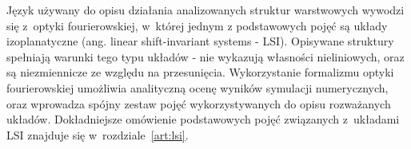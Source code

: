 Język używany do opisu działania analizowanych struktur warstwowych wywodzi się z~optyki fourierowskiej, w~której jednym z podstawowych pojęć są układy izoplanatyczne (ang. linear shift-invariant systems - LSI). Opisywane struktury spełniają warunki tego typu układów - nie wykazują własności nieliniowych, oraz są niezmiennicze ze względu na przesunięcia. Wykorzystanie formalizmu optyki fourierowskiej umożliwia analityczną ocenę wyników symulacji numerycznych, oraz wprowadza spójny zestaw pojęć wykorzystywanych do opisu rozważanych układów. Dokładniejsze omówienie podstawowych pojęć związanych z~układami LSI znajduje się w~rozdziale~\ref{art:lsi}.


